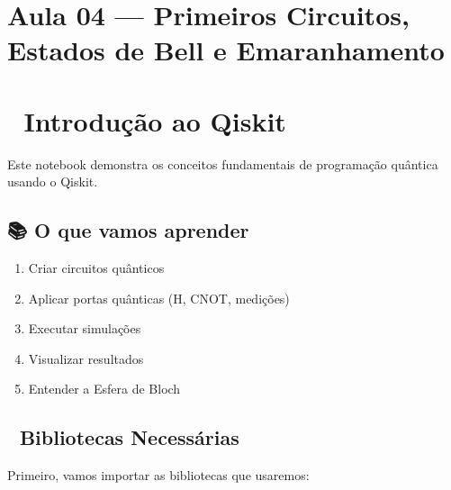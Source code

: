 \documentclass[
  brazilian,
]{report}
\providecommand{\tightlist}{%
  \setlength{\itemsep}{0pt}\setlength{\parskip}{0pt}}
\begin{document}
\chapter{Aula 04 --- Primeiros Circuitos, Estados de Bell e
Emaranhamento}\label{aula-04-primeiros-circuitos-estados-de-bell-e-emaranhamento}

\chapter{🚀 Introdução ao Qiskit}\label{introduuxe7uxe3o-ao-qiskit}

Este notebook demonstra os conceitos fundamentais de programação
quântica usando o Qiskit.

\section{📚 O que vamos aprender}\label{o-que-vamos-aprender}

\begin{enumerate}
\def\labelenumi{\arabic{enumi}.}
\tightlist
\item
  Criar circuitos quânticos
\item
  Aplicar portas quânticas (H, CNOT, medições)
\item
  Executar simulações
\item
  Visualizar resultados
\item
  Entender a Esfera de Bloch
\end{enumerate}

\section{🔧 Bibliotecas Necessárias}\label{bibliotecas-necessuxe1rias}

Primeiro, vamos importar as bibliotecas que usaremos:
\end{document}
